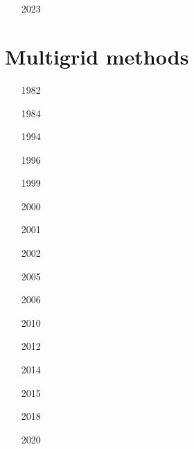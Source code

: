\begin{small}
\begin{itemize}
\item[\twothousandsix] 
\item[\twothousandthirteen]
\\
\item[\twothousandnineteen] 
\\
\item[\twothousandtwentytwo] 
\item[2023]
\item[\twothousandtwentyfour] 
\end{itemize}
\end{small}




\section{Multigrid methods} 

\begin{small}
\begin{itemize}
\item[1982]
\item[1984]
\item[1994]
\item[1996]
\item[1999]
\item[2000]
\item[2001]
\item[2002]
\item[2005]
\item[2006]
\item[2010]
\item[2012]
\item[2014]
\item[2015]
\item[2018]
\item[2020]
\end{itemize}
\end{small}












